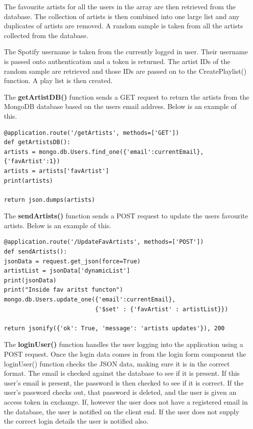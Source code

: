 The favourite artists for all the users in the array are then retrieved from the database. The collection of artists is then combined into one large list and any duplicates of artists are removed. A random sample is taken from all the artists collected from the database.\newline 

The Spotify username is taken from the currently logged in user. Their username is passed onto authentication and a token is returned. The artist IDs of the random sample are retrieved and those IDs are passed on to the CreatePlaylist() function. A play list is then created.\newline

The \textbf{getArtistDB()} function sends a GET request to return the artists from the MongoDB database based on the users email address.\newline
Below is an example of this.
\begin{verbatim} 
@application.route('/getArtists', methods=['GET'])
def getArtistsDB():
artists = mongo.db.Users.find_one({'email':currentEmail},{'favArtist':1})
artists = artists['favArtist']
print(artists)

return json.dumps(artists)
\end{verbatim}

The \textbf{sendArtists()} function sends a POST request to update the users favourite artists.\newline
Below is an example of this.
\begin{verbatim}
@application.route('/UpdateFavArtists', methods=['POST'])
def sendArtists():
jsonData = request.get_json(force=True)
artistList = jsonData['dynamicList']
print(jsonData)
print("Inside fav aritst functon")
mongo.db.Users.update_one({'email':currentEmail},
                          {'$set' : {'favArtist' : artistList}})

return jsonify({'ok': True, 'message': 'artists updates'}), 200
\end{verbatim}

The \textbf{loginUser()} function handles the user logging into the application using a POST request. Once the login data comes in from the login form component the loginUser() function checks the JSON data, making sure it is in the correct format. The email is checked against the database to see if it is present. If this user’s email is present, the password is then checked to see if it is correct.  If the user’s password checks out, that password is deleted, and the user is given an access token in exchange. 
If, however the user does not have a registered email in the database, the user is notified on the client end. If the user does not supply the correct login details the user is notified also.\newline

